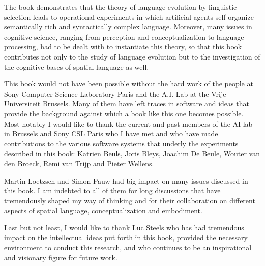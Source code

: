 The book demonstrates that the theory of language evolution 
by linguistic selection leads to operational experiments in which artificial agents 
self-organize semantically rich and syntactically complex language. Moreover, 
many issues in cognitive science, ranging from perception and conceptualization to
language processing, had to be dealt with to instantiate this theory, so that this book 
contributes not only to the study of language evolution but to the investigation 
of the cognitive bases of spatial language as well.

This book would not have been possible without the hard work of
the people at Sony Computer Science Laboratory Paris and the A.I. Lab at 
the Vrije Universiteit Brussels. Many of them have left traces in software and 
ideas that provide the background against which a book like this one becomes 
possible. Most notably I would like to thank the current and past members
of the AI lab in Brussels and Sony CSL Paris who I have met
and who have made contributions to the various software systems that underly the 
experiments described in this book: Katrien Beuls, Joris Bleys,
Joachim De Beule, Wouter van den Broeck, Remi van Trijp and Pieter Wellens. 

Martin Loetzsch and Simon Pauw had big impact on many issues discussed in this book. 
I am indebted to all of them for long discussions that have tremendously shaped my way of thinking 
and for their collaboration on different aspects of spatial language, conceptualization and embodiment.

Last but not least, I would like to thank Luc Steels who has had tremendous impact
on the intellectual ideas put forth in this book, provided the necessary environment 
to conduct this research, and who continues to be an inspirational and visionary figure
for future work.